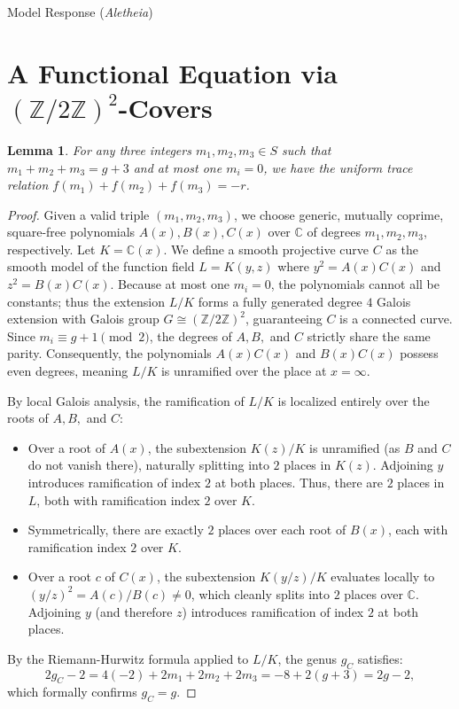 \documentclass{article}
\theoremstyle{plain}
\newtheorem{lemma}{Lemma}
\theoremstyle{definition}
\newcommand{\Aletheia}{\emph{Aletheia}}
\begin{document}
\begin{solution}{Model Response (\Aletheia)}
\section{A Functional Equation via $(\mathbb{Z}/2\mathbb{Z})^2$-Covers}

\begin{lemma} \label{lem:func_eq}
For any three integers $m_1, m_2, m_3 \in S$ such that $m_1 + m_2 + m_3 = g + 3$ and at most one $m_i = 0$, we have the uniform trace relation $f(m_1) + f(m_2) + f(m_3) = -r$.
\end{lemma}

\begin{proof}
Given a valid triple $(m_1, m_2, m_3)$, we choose generic, mutually coprime, square-free polynomials $A(x), B(x), C(x)$ over $\mathbb{C}$ of degrees $m_1, m_2, m_3$, respectively. Let $K = \mathbb{C}(x)$. We define a smooth projective curve $C$ as the smooth model of the function field $L = K(y, z)$ where $y^2 = A(x)C(x)$ and $z^2 = B(x)C(x)$. Because at most one $m_i=0$, the polynomials cannot all be constants; thus the extension $L/K$ forms a fully generated degree $4$ Galois extension with Galois group $G \cong (\mathbb{Z}/2\mathbb{Z})^2$, guaranteeing $C$ is a connected curve. Since $m_i \equiv g+1 \pmod 2$, the degrees of $A, B,$ and $C$ strictly share the same parity. Consequently, the polynomials $A(x)C(x)$ and $B(x)C(x)$ possess even degrees, meaning $L/K$ is unramified over the place at $x = \infty$.

By local Galois analysis, the ramification of $L/K$ is localized entirely over the roots of $A, B,$ and $C$:
\begin{itemize}
    \item Over a root of $A(x)$, the subextension $K(z)/K$ is unramified (as $B$ and $C$ do not vanish there), naturally splitting into $2$ places in $K(z)$. Adjoining $y$ introduces ramification of index $2$ at both places. Thus, there are $2$ places in $L$, both with ramification index $2$ over $K$.
    \item Symmetrically, there are exactly $2$ places over each root of $B(x)$, each with ramification index $2$ over $K$.
    \item Over a root $c$ of $C(x)$, the subextension $K(y/z)/K$ evaluates locally to $(y/z)^2 = A(c)/B(c) \neq 0$, which cleanly splits into $2$ places over $\mathbb{C}$. Adjoining $y$ (and therefore $z$) introduces ramification of index $2$ at both places.
\end{itemize}
By the Riemann-Hurwitz formula applied to $L/K$, the genus $g_C$ satisfies:
\[ 2g_C - 2 = 4(-2) + 2m_1 + 2m_2 + 2m_3 = -8 + 2(g+3) = 2g - 2, \]
which formally confirms $g_C = g$.


\end{proof}
\end{solution}
\end{document}
